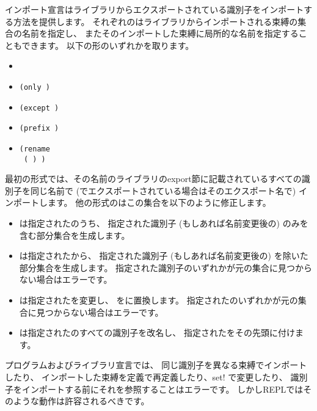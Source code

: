 インポート宣言はライブラリからエクスポートされている識別子をインポートする方法を提供します。
それぞれのはライブラリからインポートされる束縛の集合の名前を指定し、
またそのインポートした束縛に局所的な名前を指定することもできます。
以下の形のいずれかを取ります。

\begin{itemize}
\item {\tt{}}
\item {\tt(only   \dotsfoo)}
\item {\tt(except   \dotsfoo)}
\item {\tt(prefix  )}
\item {\tt(rename \\
{\obeyspaces%
\hspace*{4em}( ) \dotsfoo)}}
\end{itemize}

最初の形式では、その名前のライブラリのexport節に記載されているすべての識別子を同じ名前で
(でエクスポートされている場合はそのエクスポート名で)
インポートします。
他の形式のはこの集合を以下のように修正します。

\begin{itemize}

\item {}は指定されたのうち、
指定された識別子 (もしあれば名前変更後の) のみを含む部分集合を生成します。

\item {}は指定されたから、
指定された識別子 (もしあれば名前変更後の) を除いた部分集合を生成します。
指定された識別子のいずれかが元の集合に見つからない場合はエラーです。

\item {}は指定されたを変更し、
をに置換します。
指定されたのいずれかが元の集合に見つからない場合はエラーです。

\item {}は指定されたのすべての識別子を改名し、
指定されたをその先頭に付けます。

\end{itemize}

プログラムおよびライブラリ宣言では、
同じ識別子を異なる束縛でインポートしたり、
インポートした束縛を定義で再定義したり、{\cf set!} で変更したり、
識別子をインポートする前にそれを参照することはエラーです。
しかしREPLではそのような動作は許容されるべきです。


